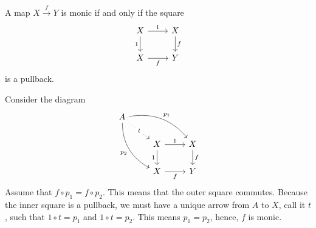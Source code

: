 \documentclass[11pt,a4paper]{article}
\begin{document}
\begin{exercise}\label{ex:monicifsquare}
    A map $X\xrightarrow{f}Y$ is monic if and only if the square
    \begin{equation*}
    \begin{tikzcd}
        X \arrow[r, "1"] \arrow[d, "1"'] & X \arrow[d, "f"] \\
        X \arrow[r, "f"'] & Y
    \end{tikzcd}
    \end{equation*}
    is a pullback.
\end{exercise}
\begin{solution}
    Consider the diagram
    \begin{equation*}
    \begin{tikzcd}
        A \arrow[drr, bend left, "p_1"] \arrow[ddr, bend right, "p_2"'] \arrow[dr, dotted, "t"description] \\
        & X \arrow[r, "1"] \arrow[d, "1"'] & X \arrow[d, "f"] \\
        & X \arrow[r, "f"'] & Y
    \end{tikzcd}
    \end{equation*}
    Assume that $f\circ p_1=f\circ p_2$. This means that the outer square commutes. Because the inner square is a pullback, we must have a unique arrow from $A$ to $X$, call it $t$, such that $1\circ t=p_1$ and $1\circ t=p_2$. This means $p_1=p_2$, hence, $f$ is monic.
\end{solution}
\end{document}
